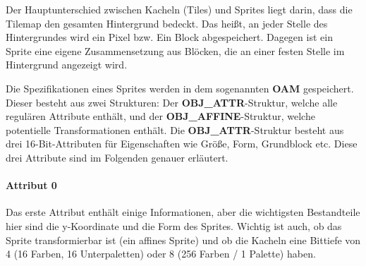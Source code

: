 Der Hauptunterschied zwischen Kacheln (Tiles) und Sprites liegt darin, dass die Tilemap den gesamten Hintergrund bedeckt. Das heißt, an jeder Stelle des Hintergrundes wird ein Pixel bzw. Ein Block abgespeichert. Dagegen ist ein Sprite eine eigene Zusammensetzung aus Blöcken, die an einer festen Stelle im Hintergrund angezeigt wird. 

Die Spezifikationen eines Sprites werden in dem sogenannten \textbf{\ac{OAM}} gespeichert. Dieser besteht aus zwei Strukturen: Der \textbf{OBJ\_ATTR}-Struktur, welche alle regulären Attribute enthält, und der \textbf{OBJ\_AFFINE}-Struktur, welche potentielle Transformationen enthält.
Die \textbf{OBJ\_ATTR}-Struktur besteht aus drei 16-Bit-Attributen für Eigenschaften wie Größe, Form, Grundblock etc. Diese drei Attribute sind im Folgenden genauer erläutert.
\paragraph{Attribut 0}
Das erste Attribut enthält einige Informationen, aber die wichtigsten Bestandteile hier sind die y-Koordinate und die Form des Sprites. Wichtig ist auch, ob das Sprite transformierbar ist (ein affines Sprite) und ob die Kacheln eine Bittiefe von 4 (16 Farben, 16 Unterpaletten) oder 8 (256 Farben / 1 Palette) haben.
